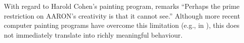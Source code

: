 With regard to Harold Cohen's painting program, \citet[p.~340]{Edmonds1994} remarks
``Perhaps the prime restriction on {\sf AARON}'s creativity is that it
cannot see.'' 
Although more recent computer painting programs have
overcome this limitation (e.g., in \citet{colton2015painting}), this
does not immediately translate into richly meaningful behaviour.



